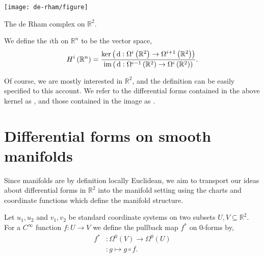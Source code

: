 \begin{marginfigure}
	\centering
	\texttt{[image: de-rham/figure]}
	\caption{The de Rham complex on $ \mathbb{R}^{2} $.}
\end{marginfigure}

\begin{definition}
	We define the $ i $th  on $ \mathbb{R}^{n} $
	to be the vector space,
	\begin{align*}
		H^i \left( \mathbb{R}^{n} \right) = \frac{\ker \left( \operatorname{\, d\!}{}:
			\Omega^i\left(\mathbb{R}^{2}\right) \to \Omega
			^{i+1}\left(\mathbb{R}^{2}\right) \right)}{\operatorname{im}\left( \operatorname{\, d\!}{}: \Omega
			^{i-1}\left(\mathbb{R}^{2}\right) \to
			\Omega^i\left(\mathbb{R}^{2}\right) \right)}.
	\end{align*}
\end{definition}

Of course, we are mostly interested in $ \mathbb{R}^{2} $, and the definition
can be easily specified to this account. We refer to the differential forms
contained in the above kernel as , and those contained in the
image as .

\section{Differential forms on smooth manifolds}
Since manifolds are by definition locally Euclidean, we aim to transport our
ideas about differential forms in $ \mathbb{R}^{2} $ into the manifold setting
using the charts and coordinate functions which define the manifold structure.

\begin{definition}[Pullback]
	Let $ u_1, u_2 $ and $ v_1, v_2 $ be standard coordinate systems on two
	subsets $ U, V \subseteq \mathbb{R}^{2} $. For a $ C ^{\infty} $ function $
		f:U \to V $ we define the pullback map $ f ^{*} $ on $ 0 $-forms by,
	\begin{align*}
		f ^{*} & : \Omega^0(V) \to \Omega^0(U) \\
		       & : g \mapsto g \circ f.
	\end{align*}
\end{definition}

